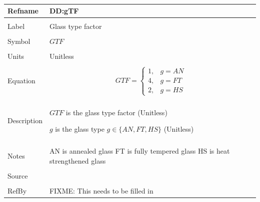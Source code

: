 \documentclass[12pt]{article}
\begin{document}
~\newline
\noindent \begin{minipage}{\textwidth}
\begin{tabular}{p{} p{}}
\toprule \textbf{Refname} & \textbf{DD:gTF}
\label{DD:gTF}
\\ \midrule \\
Label & Glass type factor
\\ \midrule \\
Symbol & $GTF$
\\ \midrule \\
Units & Unitless
\\ \midrule \\
Equation & \begin{dmath}
           GTF=\begin{cases}
1, & g=AN\\
4, & g=FT\\
2, & g=HS
\end{cases}
           \end{dmath}
\\ \midrule \\
Description & \begin{symbDescription}
              \item{$GTF$ is the glass type factor (Unitless)}
              \item{$g$ is the glass type $g\in{}\{AN,FT,HS\}$ (Unitless)}
              \end{symbDescription}
\\ \midrule \\
Notes & AN is annealed glass
        FT is fully tempered glass
        HS is heat strengthened glass
\\ \midrule \\
Source & 
\\ \midrule \\
RefBy & FIXME: This needs to be filled in
\\ \bottomrule \end{tabular}
\end{minipage}\\
~\newline
\end{document}
